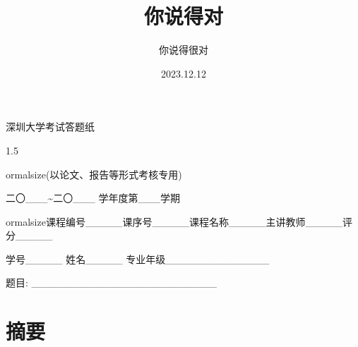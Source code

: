\documentclass[a4paper,11pt,twoside,openany]{article}
\begin{document}
\begin{center}
    \LARGE{深圳大学考试答题纸}
    \begin{spacing}{1.5}
    
ormalsize{(以论文、报告等形式考核专用)}

    二〇\_\_\_\textasciitilde{}二〇\_\_\_\; 学年度第\_\_\_学期

    
ormalsize{课程编号\_\_\_\_\_课序号\_\_\_\_\_课程名称\_\_\_\_\_主讲教师\_\_\_\_\_评分\_\_\_\_\_\;}

     学号\_\_\_\_\_\; 姓名\_\_\_\_\_\; 专业年级\_\_\_\_\_\_\_\_\_\_\_\_\_\_

    \end{spacing}

\end{center}
\begin{center}
    \Large{题目: \;\_\_\_\_\_\_\_\_\_\_\_\_\_\_\_\_\_\_\_\_\_\_\_\_\_ }
\end{center}
\title{你说得对}
\author{你说得很对}
\date{2023.12.12}
\maketitle

\section{摘要}
\end{document}
